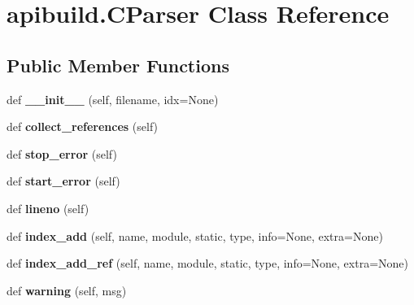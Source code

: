 \hypertarget{classapibuild_1_1_c_parser}{}\section{apibuild.\+C\+Parser Class Reference}
\label{classapibuild_1_1_c_parser}
\subsection*{Public Member Functions}
\begin{DoxyCompactItemize}
\item 
\mbox{\label{classapibuild_1_1_c_parser_a7441c7aa944b22a0ee85c128bfdb3af2}} 
def {\bfseries \+\_\+\+\_\+init\+\_\+\+\_\+} (self, filename, idx=None)
\item 
\mbox{\label{classapibuild_1_1_c_parser_a20cf1cd1cba54e3b4ecada122709eea1}} 
def {\bfseries collect\+\_\+references} (self)
\item 
\mbox{\label{classapibuild_1_1_c_parser_a98320a7ed7f0b1fb9d90cb6412d76caf}} 
def {\bfseries stop\+\_\+error} (self)
\item 
\mbox{\label{classapibuild_1_1_c_parser_ac137cbeb0b91c0b4e231b1ca4ab3fef9}} 
def {\bfseries start\+\_\+error} (self)
\item 
\mbox{\label{classapibuild_1_1_c_parser_ae306a4ad47d51a75c83274d23f4a1451}} 
def {\bfseries lineno} (self)
\item 
\mbox{\label{classapibuild_1_1_c_parser_a0bda59c2c59c2ca1b4587cb36a34f2c2}} 
def {\bfseries index\+\_\+add} (self, name, module, static, type, info=None, extra=None)
\item 
\mbox{\label{classapibuild_1_1_c_parser_a9fa8df64a82f7abb3efe3fa00e463e04}} 
def {\bfseries index\+\_\+add\+\_\+ref} (self, name, module, static, type, info=None, extra=None)
\item 
\mbox{\label{classapibuild_1_1_c_parser_a0d1cce46c083e7c692a426da97becada}} 
def {\bfseries warning} (self, msg)

\end{DoxyCompactItemize}
